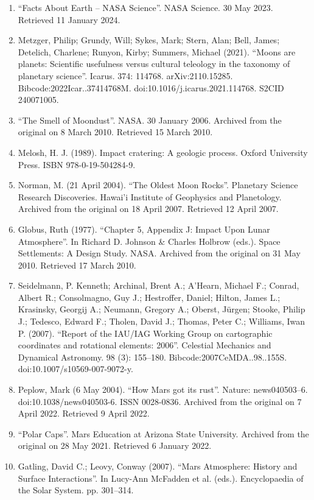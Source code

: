 \begin{enumerate}
\item ``Facts About Earth – NASA Science''. NASA Science. 30 May 2023. Retrieved 11 January 2024.
\item Metzger, Philip; Grundy, Will; Sykes, Mark; Stern, Alan; Bell, James; Detelich, Charlene; Runyon, Kirby; Summers, Michael (2021). ``Moons are planets: Scientific usefulness versus cultural teleology in the taxonomy of planetary science''. Icarus. 374: 114768. arXiv:2110.15285. Bibcode:2022Icar..37414768M. doi:10.1016/j.icarus.2021.114768. S2CID 240071005.
\item ``The Smell of Moondust''. NASA. 30 January 2006. Archived from the original on 8 March 2010. Retrieved 15 March 2010.
\item Melosh, H. J. (1989). Impact cratering: A geologic process. Oxford University Press. ISBN 978-0-19-504284-9.
\item Norman, M. (21 April 2004). ``The Oldest Moon Rocks''. Planetary Science Research Discoveries. Hawai'i Institute of Geophysics and Planetology. Archived from the original on 18 April 2007. Retrieved 12 April 2007.
\item Globus, Ruth (1977). ``Chapter 5, Appendix J: Impact Upon Lunar Atmosphere''. In Richard D. Johnson \& Charles Holbrow (eds.). Space Settlements: A Design Study. NASA. Archived from the original on 31 May 2010. Retrieved 17 March 2010.
\item Seidelmann, P. Kenneth; Archinal, Brent A.; A'Hearn, Michael F.; Conrad, Albert R.; Consolmagno, Guy J.; Hestroffer, Daniel; Hilton, James L.; Krasinsky, Georgij A.; Neumann, Gregory A.; Oberst, Jürgen; Stooke, Philip J.; Tedesco, Edward F.; Tholen, David J.; Thomas, Peter C.; Williams, Iwan P. (2007). ``Report of the IAU/IAG Working Group on cartographic coordinates and rotational elements: 2006''. Celestial Mechanics and Dynamical Astronomy. 98 (3): 155–180. Bibcode:2007CeMDA..98..155S. doi:10.1007/s10569-007-9072-y.
\item Peplow, Mark (6 May 2004). ``How Mars got its rust''. Nature: news040503–6. doi:10.1038/news040503-6. ISSN 0028-0836. Archived from the original on 7 April 2022. Retrieved 9 April 2022.
\item ``Polar Caps''. Mars Education at Arizona State University. Archived from the original on 28 May 2021. Retrieved 6 January 2022.
\item Gatling, David C.; Leovy, Conway (2007). ``Mars Atmosphere: History and Surface Interactions''. In Lucy-Ann McFadden et al. (eds.). Encyclopaedia of the Solar System. pp. 301–314.

\end{enumerate}
